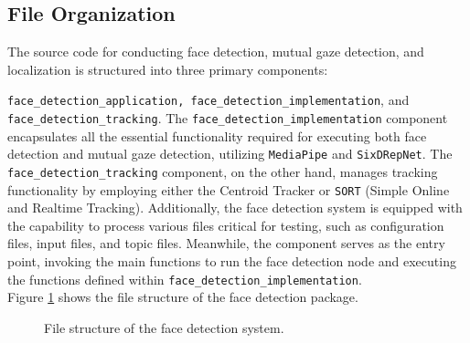 \documentclass{CSSRforAfrica}
\begin{document}
\subsection*{File Organization}
The source code for conducting face detection, mutual gaze detection, and localization is structured into three primary components: {\fontsize{9.0}{10.0}\selectfont\texttt{{face\_detection\_application}, \texttt{face\_detection\_implementation}}, and \small{\texttt{face\_detection\_tracking}}. The \texttt{face\_detection\_implementation} component encapsulates all the essential functionality required for executing both face detection and mutual gaze detection, utilizing \texttt{MediaPipe} and \texttt{SixDRepNet}. The \texttt{face\_detection\_tracking} component, on the other hand, manages tracking functionality by employing either the Centroid Tracker or \texttt{SORT} (Simple Online and Realtime Tracking). Additionally, the face detection system is equipped with the capability to process various files critical for testing, such as configuration files, input files, and topic files. Meanwhile, the {\fontsize{8.0}{9.0}} component serves as the entry point, invoking the main functions to run the face detection node and executing the functions defined within \texttt{face\_detection\_implementation}.\\

Figure \ref{fig:face_detection_directory} shows the file structure of the face detection package.

\begin{figure}[h]	
	\renewcommand*\DTstyle{\ttfamily}
	\caption{File structure of the face detection system.}
	\label{fig:face_detection_directory}
\end{figure}

\newpage
}
\end{document}
